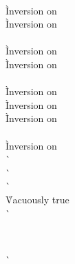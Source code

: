 \begin{description}
\begin{tabbing}
   \\
    \` Inversion on  \\
    \` Inversion on  \\
  \\
    \` Inversion on  \\
    \` Inversion on  \\
   \\
    \` Inversion on  \\
    \` Inversion on  \\
    \` Inversion on  \\
  \\
    \` Inversion on  \\
    \`  \\
    \`  \\
    \`  \\
    \` Vacuously true \\
    \`  \\

  \end{tabbing}

\item[\rulesteppopallocarrayerr] \ \\
  \begin{tabbing}
    \`  \\
  \end{tabbing}


\end{description}
